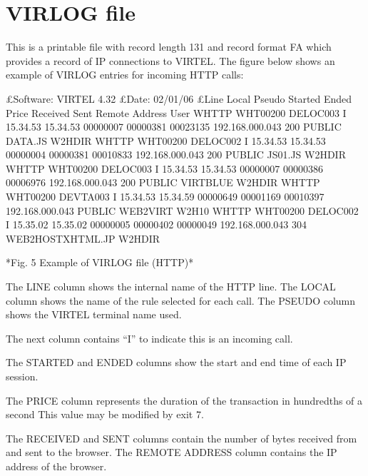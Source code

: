 \documentclass[letterpaper,10pt,english]{sphinxmanual}
\begin{document}


\section{VIRLOG file}
\label{\detokenize{audit_operations_ and_performance:index-74}}\label{\detokenize{audit_operations_ and_performance:virlog-file}}
This is a printable file with record length 131 and record format FA which provides a record of IP connections to VIRTEL. The figure below shows an example of VIRLOG entries for incoming
HTTP calls:

\begin{sphinxVerbatim}[commandchars=\\\{\}]
£Software: VIRTEL 4.32
£Date: 02/01/06
£Line Local Pseudo Started Ended Price Received Sent Remote Address User
W\PYGZhy{}HTTP WHT00200 DELOC003 I 15.34.53 15.34.53 00000007 00000381 00023135 192.168.000.043 200 PUBLIC DATA.JS W2H\PYGZhy{}DIR
W\PYGZhy{}HTTP WHT00200 DELOC002 I 15.34.53 15.34.53 00000004 00000381 00010833 192.168.000.043 200 PUBLIC JS01.JS W2H\PYGZhy{}DIR
W\PYGZhy{}HTTP WHT00200 DELOC003 I 15.34.53 15.34.53 00000007 00000386 00006976 192.168.000.043 200 PUBLIC VIRTBLUE W2H\PYGZhy{}DIR
W\PYGZhy{}HTTP WHT00200 DEVTA003 I 15.34.53 15.34.59 00000649 00001169 00010397 192.168.000.043 PUBLIC WEB2VIRT W2H\PYGZhy{}10
W\PYGZhy{}HTTP WHT00200 DELOC002 I 15.35.02 15.35.02 00000005 00000402 00000049 192.168.000.043 304 WEB2HOSTXHTML.JP W2H\PYGZhy{}DIR

*Fig. 5 Example of VIRLOG file (HTTP)*
\end{sphinxVerbatim}

The LINE column shows the internal name of the HTTP line.
The LOCAL column shows the name of the rule selected for each call.
The PSEUDO column shows the VIRTEL terminal name used.

The next column contains “I” to indicate this is an incoming call.

The STARTED and ENDED columns show the start and end time of each IP session.

The PRICE column represents the duration of the transaction in hundredths of a second This value may be modified by exit 7.

The RECEIVED and SENT columns contain the number of bytes received from and sent to the browser. The REMOTE ADDRESS column contains the IP address of the browser.
\end{document}
